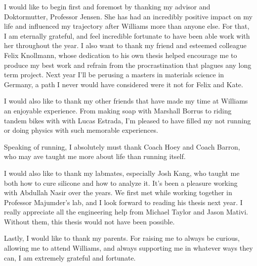 
I would like to begin first and foremost by thanking my advisor and Doktormutter, Professor Jensen. She has had an incredibly positive impact on my life and influenced my trajectory after Williams more than anyone else. For that, I am eternally grateful, and feel incredible fortunate to have been able work with her throughout the year. I also want to thank my friend and esteemed colleague Felix Knollmann, whose dedication to his own thesis helped encourage me to produce my best work and refrain from the procrastination that plagues any long term project. Next year I'll be perusing a masters in materials science in Germany, a path I never would have considered were it not for Felix and Kate. 

I would also like to thank my other friends that have made my time at Williams an enjoyable experience. From making soap with Marshall Borrus to riding tandem bikes with with Lucas Estrada, I'm pleased to have filled my not running or doing physics with such memorable experiences. 

Speaking of running, I absolutely must thank Coach Hoey and Coach Barron, who may ave taught me more about life than running itself. 

I would also like to thank my labmates, especially Josh Kang, who taught me both how to cure silicone and how to analyze it. It's been a pleasure working with Abdullah Nasir over the years. We first met while working together in Professor Majumder's lab, and I look forward to reading his thesis next year. I really appreciate all the engineering help from Michael Taylor and Jason Mativi. Without them, this thesis would not have been possible.

Lastly, I would like to thank my parents. For raising me to always be curious, allowing me to attend Williams, and always supporting me in whatever ways they can, I am extremely grateful and fortunate. 


